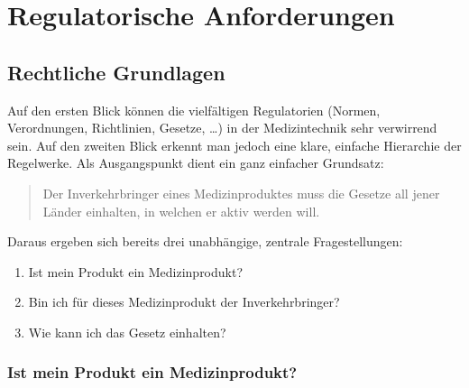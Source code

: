 \chapter{Regulatorische Anforderungen}

\section{Rechtliche Grundlagen}

Auf den ersten Blick können die vielfältigen Regulatorien (Normen, Verordnungen, Richtlinien, Gesetze, \dots) in der Medizintechnik sehr verwirrend sein. Auf den zweiten Blick erkennt man jedoch eine klare, einfache Hierarchie der Regelwerke. Als Ausgangspunkt dient ein ganz einfacher Grundsatz: 
\begin{quote}
	Der Inverkehrbringer eines Medizinproduktes muss die Gesetze all jener Länder einhalten, in welchen er aktiv werden will.
\end{quote}

Daraus ergeben sich bereits drei unabhängige, zentrale Fragestellungen:
\begin{enumerate}
	\item Ist mein Produkt ein Medizinprodukt?
	\item Bin ich für dieses Medizinprodukt der Inverkehrbringer?
	\item Wie kann ich das Gesetz einhalten?
\end{enumerate}

\subsection{Ist mein Produkt ein Medizinprodukt?}

